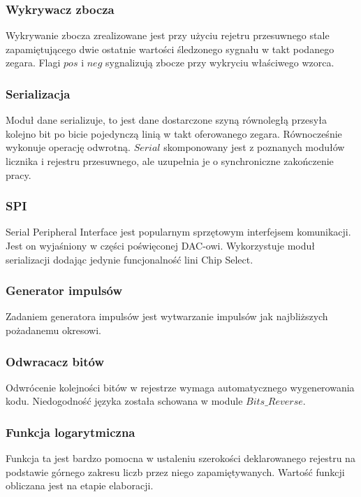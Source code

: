 \documentclass[a4paper,12pt]{article}
\begin{document}
\subsubsection{Wykrywacz zbocza}
Wykrywanie zbocza zrealizowane jest przy użyciu rejetru przesuwnego stale zapamiętującego dwie ostatnie wartości śledzonego sygnału w takt podanego zegara. Flagi $pos$ i $neg$ sygnalizują zbocze przy wykryciu właściwego wzorca.


\subsubsection{Serializacja}
Moduł dane serializuje, to jest dane dostarczone szyną równoległą przesyła kolejno bit po bicie pojedynczą linią w takt oferowanego zegara. Równocześnie wykonuje operację odwrotną. $Serial$ skomponowany jest z poznanych modułów licznika i rejestru przesuwnego, ale uzupełnia je o synchroniczne zakończenie pracy.


\subsubsection{SPI}
Serial Peripheral Interface jest popularnym sprzętowym interfejsem komunikacji. Jest on wyjaśniony w części poświęconej DAC-owi. Wykorzystuje moduł serializacji dodając jedynie funcjonalność lini Chip Select.


\subsubsection{Generator impulsów}
Zadaniem generatora impulsów jest wytwarzanie impulsów jak najbliższych pożadanemu okresowi.


\subsubsection{Odwracacz bitów}
Odwrócenie kolejności bitów w rejestrze wymaga automatycznego wygenerowania kodu. Niedogodność języka została schowana w module $Bits\_Reverse$.


\subsubsection{Funkcja logarytmiczna}
Funkcja ta jest bardzo pomocna w ustaleniu szerokości deklarowanego rejestru na podstawie górnego zakresu liczb przez niego zapamiętywanych. Wartość funkcji obliczana jest na etapie elaboracji.

\end{document}
